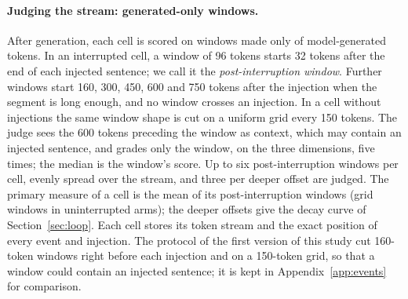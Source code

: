 \paragraph{Judging the stream: generated-only windows.} After generation,
each cell is scored on windows made only of model-generated tokens. In an
interrupted cell, a window of 96 tokens starts 32 tokens after the end of
each injected sentence; we call it the \emph{post-interruption window}.
Further windows start 160, 300, 450, 600 and 750 tokens after the injection
when the segment is long enough, and no window crosses an injection. In a
cell without injections the same window shape is cut on a uniform grid every
150 tokens. The judge sees the 600 tokens preceding the window as context,
which may contain an injected sentence, and grades only the window, on the
three dimensions, five times; the median is the window's score. Up to six
post-interruption windows per cell, evenly spread over the stream, and three
per deeper offset are judged. The primary measure of a cell is the mean of
its post-interruption windows (grid windows in uninterrupted arms); the
deeper offsets give the decay curve of Section~\ref{sec:loop}. Each cell
stores its token stream and the exact position of every event and
injection. The protocol of the first version of this study cut 160-token
windows right before each injection and on a 150-token grid, so that a
window could contain an injected sentence; it is kept in
Appendix~\ref{app:events} for comparison.
